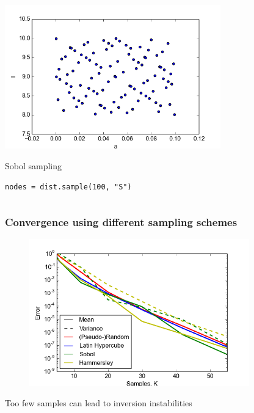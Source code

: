 \documentclass{beamer}
\begin{document}
\begin{frame}[fragile]
\begin{columns}
\begin{center}
                \includegraphics[width=0.7\textwidth]{samples_S.png}

                Sobol sampling

                \scriptsize
                \verb;nodes = dist.sample(100, "S");
                \normalsize
     \end{center}
 \end{columns}
\end{frame}


\begin{frame}
 \frametitle{Convergence using different sampling schemes}
  \begin{figure}
  \includegraphics[width=0.85\textwidth]{convergence_collocation_compare.png}
 \end{figure}
\end{frame}

\begin{frame}{Too few samples can lead to inversion instabilities}
\end{frame}
\end{document}
